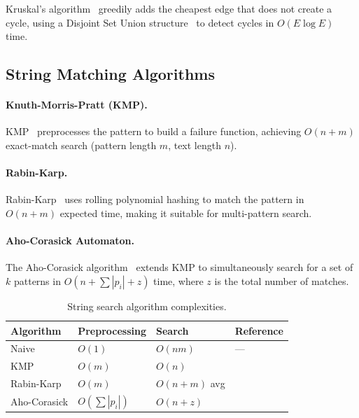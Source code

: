 \documentclass[12pt,a4paper]{article}
\begin{document}
Kruskal's algorithm~\cite{kruskal1956,cormen2022} greedily adds the cheapest
edge that does not create a cycle, using a Disjoint Set Union structure~\cite{tarjan1975}
to detect cycles in $O(E\log E)$ time.

\subsection{String Matching Algorithms}

\paragraph{Knuth-Morris-Pratt (KMP).}
KMP~\cite{knuth1977kmp} preprocesses the pattern to build a failure function,
achieving $O(n+m)$ exact-match search (pattern length $m$, text length $n$).

\paragraph{Rabin-Karp.}
Rabin-Karp~\cite{karp1987} uses rolling polynomial hashing to match the
pattern in $O(n+m)$ expected time, making it suitable for multi-pattern search.

\paragraph{Aho-Corasick Automaton.}
The Aho-Corasick algorithm~\cite{aho1975} extends KMP to simultaneously search
for a set of $k$ patterns in $O(n + \sum |p_i| + z)$ time, where $z$ is the
total number of matches.

\begin{table}[h]
\centering
\caption{String search algorithm complexities.}
\begin{tabular}{llll}
\toprule
\textbf{Algorithm} & \textbf{Preprocessing} & \textbf{Search} & \textbf{Reference} \\
\midrule
Naive       & $O(1)$     & $O(nm)$      & --- \\
KMP         & $O(m)$     & $O(n)$       & \cite{knuth1977kmp} \\
Rabin-Karp  & $O(m)$     & $O(n+m)$ avg & \cite{karp1987} \\
Aho-Corasick& $O(\sum|p_i|)$ & $O(n+z)$ & \cite{aho1975} \\
\bottomrule
\end{tabular}
\end{table}


\end{document}
